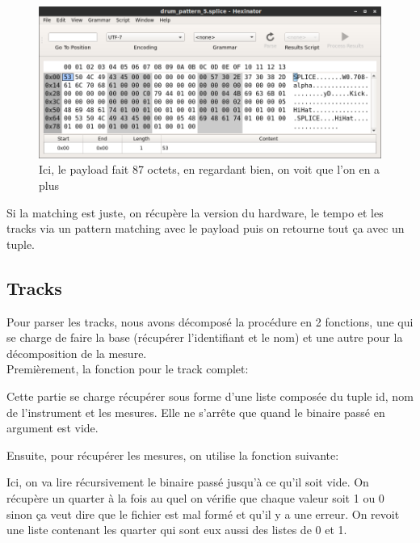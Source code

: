 \documentclass[10pt,a4paper]{article}
\begin{document}
\begin{figure}[ht]
	\includegraphics[scale=0.51]{images/hexa_fail.png}
	\caption{Ici, le payload fait 87 octets, en regardant bien, on voit que l'on en a plus}
\end{figure}

Si la matching est juste, on récupère la version du hardware, le tempo et les tracks via un pattern matching avec le payload puis on retourne tout ça avec un tuple.

\subsection{Tracks}
Pour parser les tracks, nous avons décomposé la procédure en 2 fonctions, une qui se charge de faire la base (récupérer l'identifiant et le nom) et une autre pour la décomposition de la mesure.\\

Premièrement, la fonction pour le track complet:



\newpage

Cette partie se charge récupérer sous forme d'une liste composée du tuple id, nom de l'instrument et les mesures. Elle ne s'arrête que quand le binaire passé en argument est vide.

Ensuite, pour récupérer les mesures, on utilise la fonction suivante:



Ici, on va lire récursivement le binaire passé jusqu'à ce qu'il soit vide. On récupère un quarter à la fois au quel on vérifie que chaque valeur soit 1 ou 0 sinon ça veut dire que le fichier est mal formé et qu'il y a une erreur. On revoit une liste contenant les quarter qui sont eux aussi des listes de 0 et 1.
\end{document}
